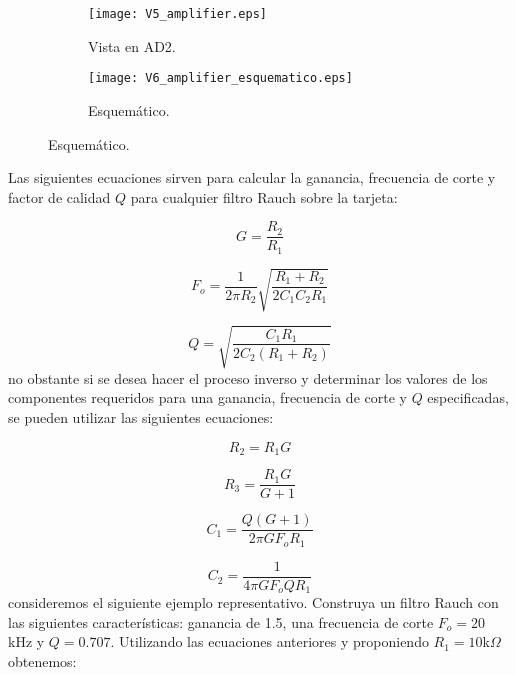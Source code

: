 	\begin{figure}[!ht]
	\centering   
	\caption{Diferentes representaciones de filtro Rauch.}
	\label{fig:filtro_rauch}
		\begin{subfigure}{0.3\textwidth}
			\centering   
			\texttt{[image: V5\_amplifier.eps]}
			\caption{Vista en AD2.}
			\label{fig:V5_amplifier}
		\end{subfigure}
		\begin{subfigure}{0.65\textwidth}
			\centering   
			\texttt{[image: V6\_amplifier\_esquematico.eps]}
			\caption{Esquemático.}
			\label{fig:V6_amplifier_esquematico}
		\end{subfigure}
	\end{figure}

	Las siguientes ecuaciones sirven para calcular la ganancia, frecuencia de corte y factor de calidad $Q$ para cualquier filtro Rauch sobre la tarjeta:
	
	\begin{equation}
		G = \frac{R_{2}}{R_{1}}
	\end{equation}
	
	\begin{equation}
		F_{o} = \frac{1}{2 \pi R_{2}} \sqrt{ \frac{R_{1}+ R_{2} }{2 C_{1} C_{2} R_{1}}}
	\end{equation}
	
	\begin{equation}
		Q = \sqrt{\frac{C_{1} R_{1}}{2 C_{2} (R_{1} + R_{2})}}
	\end{equation}
	no obstante si se desea hacer el proceso inverso y determinar los valores de los componentes requeridos para una ganancia, frecuencia de corte y $Q$ especificadas, se pueden utilizar las siguientes ecuaciones: 
	
	\begin{equation}
		R_{2} = R_{1} G
	\end{equation}
	
	\begin{equation}
		R_{3} = \frac{R_{1} G}{G + 1}
	\end{equation}
	
	\begin{equation}
		C_{1} = \frac{Q (G + 1)}{2 \pi G F_{o} R_{1}}
	\end{equation}
	
	\begin{equation}
		C_{2} = \frac{1}{4 \pi G F_{o} Q R_{1}}
	\end{equation}
	consideremos el siguiente ejemplo representativo. Construya un filtro Rauch con las siguientes características: ganancia de 1.5, una frecuencia de corte $F_{o} = 20$ kHz y $Q = 0.707$. Utilizando las ecuaciones anteriores y proponiendo $R_{1} = 10$k$\Omega$ obtenemos:
	
